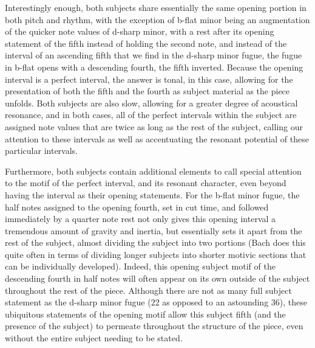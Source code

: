 Interestingly enough, both subjects share essentially the same opening
portion in both pitch and rhythm, with the exception of b-flat minor
being an augmentation of the quicker note values of d-sharp minor, with
a rest after its opening statement of the fifth instead of holding the
second note, and instead of the interval of an ascending fifth that we
find in the d-sharp minor fugue, the fugue in b-flat opens with a
descending fourth, the fifth inverted. Because the opening interval is a
perfect interval, the answer is tonal, in this case, allowing for the
presentation of both the fifth and the fourth as subject material as the
piece unfolds. Both subjects are also slow, allowing for a greater
degree of acoustical resonance, and in both cases, all of the perfect
intervals within the subject are assigned note values that are twice as
long as the rest of the subject, calling our attention to these
intervals as well as accentuating the resonant potential of these
particular intervals.

Furthermore, both subjects contain additional elements to call special
attention to the motif of the perfect interval, and its resonant
character, even beyond having the interval as their opening statements.
For the b-flat minor fugue, the half notes assigned to the opening
fourth, set in cut time, and followed immediately by a quarter note rest
not only gives this opening interval a tremendous amount of gravity and
inertia, but essentially sets it apart from the rest of the subject,
almost dividing the subject into two portions (Bach does this quite
often in terms of dividing longer subjects into shorter motivic sections
that can be individually developed). Indeed, this opening subject motif
of the descending fourth in half notes will often appear on its own
outside of the subject throughout the rest of the piece. Although there
are not as many full subject statement as the d-sharp minor fugue (22 as
opposed to an astounding 36), these ubiquitous statements of the opening
motif allow this subject fifth (and the presence of the subject) to
permeate throughout the structure of the piece, even without the entire
subject needing to be stated.

